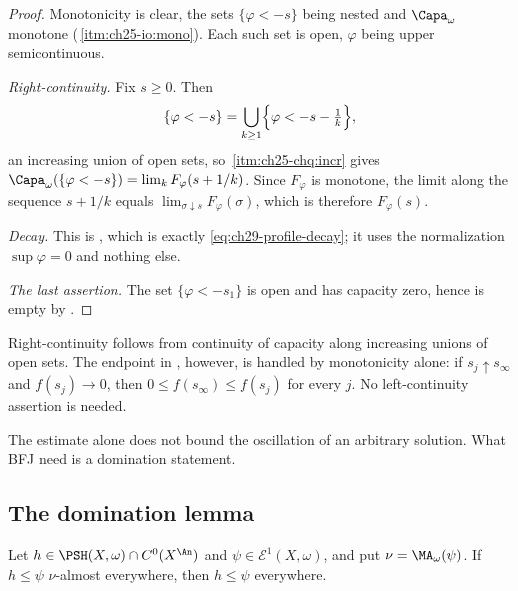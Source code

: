 \begin{proof}
Monotonicity is clear, the sets $\{\varphi<-s\}$ being nested and
$\Capa_\omega$ monotone
(\,\cref{itm:ch25-io:mono}).  Each such set is
open, $\varphi$ being upper semicontinuous.

\emph{Right-continuity.}  Fix $s\geq0$.  Then
\[
 \{\varphi<-s\}=\bigcup_{k\geq1}\Bigl\{\varphi<-s-\tfrac1k\Bigr\},
\]
an increasing union of open sets, so
\,\cref{itm:ch25-chq:incr} gives
$\Capa_\omega(\{\varphi<-s\})=\lim_kF_\varphi(s+1/k)$.  Since
$F_\varphi$ is monotone, the limit along the sequence $s+1/k$ equals
$\lim_{\sigma\downarrow s}F_\varphi(\sigma)$, which is therefore
$F_\varphi(s)$.

\emph{Decay.}  This is , which is exactly
\eqref{eq:ch29-profile-decay}; it uses the normalization
$\sup\varphi=0$ and nothing else.

\emph{The last assertion.}  The set $\{\varphi<-s_1\}$ is open and has
capacity zero, hence is empty by
.
\end{proof}

\begin{remark}
\label{rem:ch29-right-continuity}
Right-continuity follows from continuity of capacity along increasing
unions of open sets.  The endpoint in , however,
is handled by monotonicity alone: if $s_j\uparrow s_\infty$ and
$f(s_j)\to0$, then $0\leq f(s_\infty)\leq f(s_j)$ for every $j$.
No left-continuity assertion is needed.
\end{remark}

The estimate alone does not bound the oscillation of an arbitrary solution.
What BFJ need is a domination statement.

\subsection{The domination lemma}
\label{sec:ch29-domination}

\begin{lemma}\label{lem:bfj-supported-domination}
Let $h\in\PSH(X,\omega)\cap C^0(X^{\An})$ and
$\psi\in\mathcal E^1(X,\omega)$, and put
$\nu=\MA_\omega(\psi)$.
If $h\leq\psi$ $\nu$-almost everywhere, then $h\leq\psi$ everywhere.
\end{lemma}

